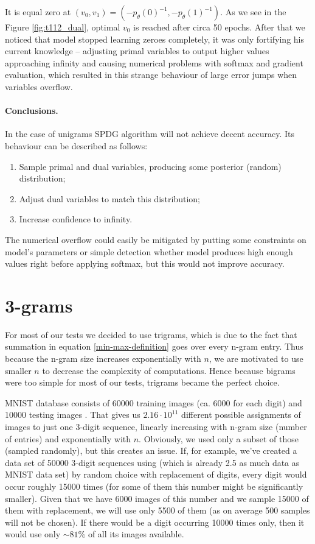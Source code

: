 \documentclass[declaration,shortabstract,lic,english]{iithesis}
\begin{document}
It is equal zero at $(v_0, v_1) = (-p_\theta(0)^{-1}, -p_\theta(1)^{-1})$. As we see in the Figure \ref{fig:t112_dual}, optimal $v_0$ is reached after circa 50 epochs. After that we noticed that model stopped learning zeroes completely, it was only fortifying his current knowledge -- adjusting primal variables to output higher values approaching infinity and causing numerical problems with softmax and gradient evaluation, which resulted in this strange behaviour of large error jumps when variables overflow.

\paragraph{Conclusions.} In the case of unigrams SPDG algorithm will not achieve decent accuracy. Its behaviour can be described as follows:
\begin{enumerate}
    \item Sample primal and dual variables, producing some posterior (random) distribution;
    \item Adjust dual variables to match this distribution;
    \item Increase confidence to infinity.
\end{enumerate}

The numerical overflow could easily be mitigated by putting some constraints on model's parameters or simple detection whether model produces high enough values right before applying softmax, but this would not improve accuracy.

\section{3-grams}

For most of our tests we decided to use trigrams, which is due to the fact that summation in equation \ref{min-max-definition} goes over every n-gram entry. Thus because the n-gram size increases exponentially with $n$, we are motivated to use smaller $n$ to decrease the complexity of computations. Hence because bigrams were too simple for most of our tests, trigrams became the perfect choice.

MNIST database consists of 60000 training images (ca. 6000 for each digit) and 10000 testing images \citep{mnist}. That gives us $2.16\cdot10^{11}$ different possible assignments of images to just one 3-digit sequence, linearly increasing with n-gram size (number of entries) and exponentially with $n$. Obviously, we used only a subset of those (sampled randomly), but this creates an issue. If, for example, we've created a data set of 50000 3-digit sequences using (which is already 2.5 as much data as MNIST data set) by random choice with replacement of digits, every digit would occur roughly 15000 times (for some of them this number might be significantly smaller). Given that we have 6000 images of this number and we sample 15000 of them with replacement, we will use only 5500 of them (as on average 500 samples will not be chosen). If there would be a digit occurring 10000 times only, then it would use only $\sim81\%$ of all its images available.
\end{document}
